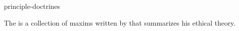 \documentclass{stex}
\begin{document}
\begin{smodule}{principle-doctrines}
\begin{sparagraph}[style=symdoc]
The  is a collection of maxims written by
 that summarizes his ethical theory.
\end{sparagraph}
\end{smodule}
\end{document}
